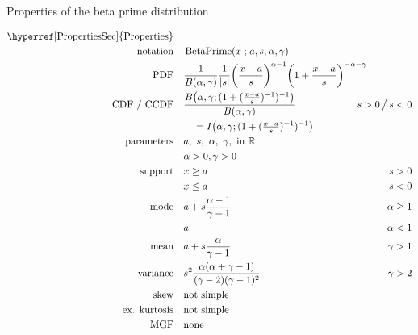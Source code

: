 

\begin{table*}[tp]
\caption[Beta prime distribution -- Properties] {Properties of the beta prime distribution}
\begin{align*}
 \text{\hyperref[PropertiesSec]{Properties}}  \quad& \\
\text{notation} \quad & \op{BetaPrime}(x\given a, s, \alpha,\gamma)  	\checked
\\
\text{PDF}\quad &    \frac{1}{B(\alpha, \gamma)} \frac{1}{|s|}
\Left(\frac{x-a}{s}\Right)^{\alpha -1} \Left(1+ \frac{x-a}{s} \Right)^{-\alpha-\gamma } \checked
\hspace{-2em}
\\
\text{CDF / CCDF} \quad  &  
\frac{B\big(\alpha, \gamma; (1+(\tfrac{x-a}{s})^{-1})^{-1} \big) }{B(\alpha,\gamma)} \checked
\hspace{-8em}
& s >0 \,\big/ \, s<0
\\ 
& \quad = I\Left(  \alpha,\gamma; (1+(\tfrac{x-a}{s})^{-1})^{-1} \Right) 			\checked
\\
\text{parameters}\quad &   a,\ s,\ \alpha,\ \gamma, \text{ in } \Real \checked 
\\ & \alpha>0, \gamma>0 \checked
\\
\text{support} \quad &    x \geq a &  s > 0 			\checked
\\
&  x\leq a  &  s < 0 							\checked
\\
\text{mode} \quad  & a + s \frac{\alpha-1}{\gamma+1} & \alpha\geq 1 \checked \\
& a &\alpha<1 \checked
\\
\text{mean} \quad  &   a+s \frac{ \alpha}{\gamma-1} \checked
& \gamma >1
\\
\text{variance} \quad  &s^2
\frac{\alpha(\alpha+\gamma-1)}{(\gamma-2)(\gamma-1)^2} \checked
  \hspace{-8em}
&   \gamma>2
\\
\text{skew} \quad  &  \text{not simple}
\\
\text{ex. kurtosis} \quad  &  \text{not simple}
\\
\text{MGF} \quad  &  \text{none}
\end{align*}
\end{table*}


